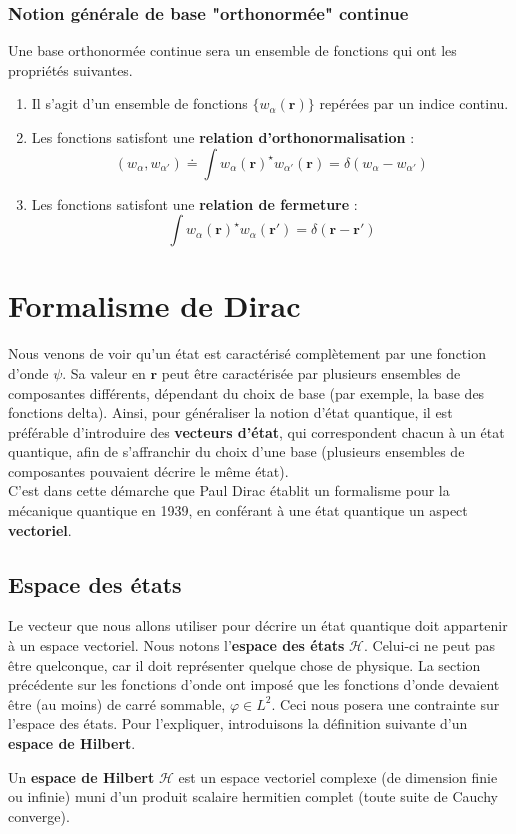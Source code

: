 \documentclass[../notesdecours.tex]{subfiles}
\begin{document}
\subsubsection{Notion générale de base "orthonormée" continue}
Une base orthonormée continue sera un ensemble de fonctions qui ont les propriétés suivantes.
\begin{enumerate}
\item Il s'agit d'un ensemble de fonctions $\{ w_\alpha(\bm{r})\}$ repérées par un indice continu. \\

\item Les fonctions satisfont une \textbf{relation d'orthonormalisation} :
$$(w_{\alpha}, w_{\alpha'}) \doteq \int w_{\alpha}(\bm{r})^\star w_{\alpha'}(\bm{r}) = \delta(w_{\alpha} - w_{\alpha'})$$

\item Les fonctions satisfont une \textbf{relation de fermeture} :
$$\int w_{\alpha}(\bm{r})^\star w_{\alpha}(\bm{r}') = \delta(\bm{r}-\bm{r}')$$
\end{enumerate}
\section{Formalisme de Dirac}
Nous venons de voir qu'un état est caractérisé complètement par une fonction d'onde $\psi$. Sa valeur en $\bm{r}$ peut être caractérisée par plusieurs ensembles de composantes différents, dépendant du choix de base (par exemple, la base des fonctions delta). Ainsi, pour généraliser la notion d'état quantique, il est préférable d'introduire des \textbf{vecteurs d'état}, qui correspondent chacun à un état quantique, afin de s'affranchir du choix d'une base (plusieurs ensembles de composantes pouvaient décrire le même état). \\

C'est dans cette démarche que Paul Dirac établit un formalisme pour la mécanique quantique en 1939, en conférant à une état quantique un aspect \textbf{vectoriel}. 
\subsection{Espace des états}
Le vecteur que nous allons utiliser pour décrire un état quantique doit appartenir à un espace vectoriel. Nous notons l'\textbf{espace des états} $\mathcal{H}$. Celui-ci ne peut pas être quelconque, car il doit représenter quelque chose de physique. La section précédente sur les fonctions d'onde ont imposé que les fonctions d'onde devaient être (au moins) de carré sommable, $\varphi \in L^2$. Ceci nous posera une contrainte sur l'espace des états. Pour l'expliquer, introduisons la définition suivante d'un \textbf{espace de Hilbert}.
\begin{definition}
	Un \textbf{espace de Hilbert} $\mathcal{H}$ est un espace vectoriel complexe (de dimension finie ou infinie) muni d'un produit scalaire hermitien complet (toute suite de Cauchy converge).
\end{definition}
\end{document}
